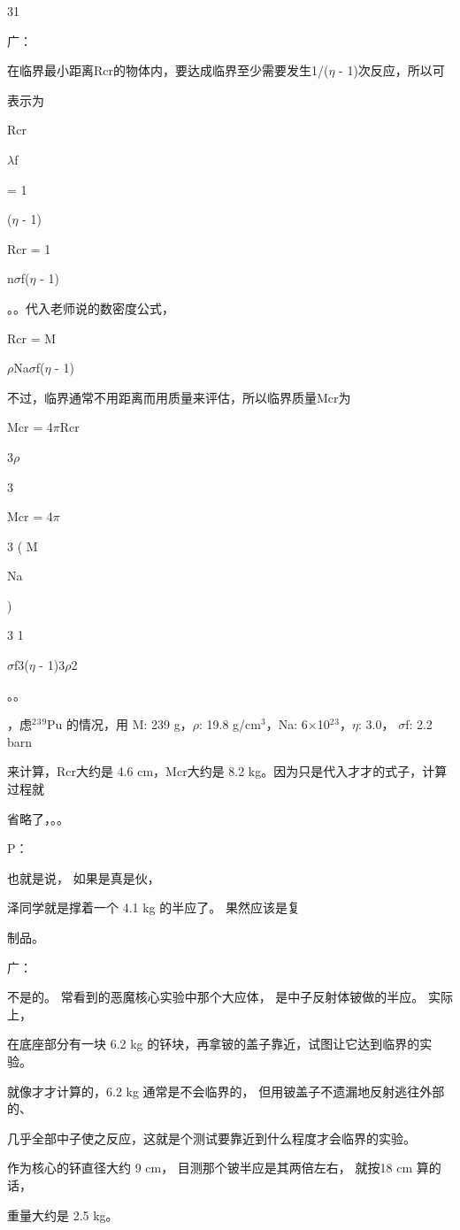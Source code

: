 31\par
广：\par
在临界最小距离Rcr的物体内，要达成临界至少需要发生1/($\eta$ - 1)次反应，所以可\par
表示为\par
Rcr\par
$\lambda$f\par
= 1\par
($\eta$ - 1)\par
Rcr = 1\par
n$\sigma$f($\eta$ - 1)\par
。。代入老师说的数密度公式，\par
Rcr = M\par
$\rho$Na$\sigma$f($\eta$ - 1)\par
不过，临界通常不用距离而用质量来评估，所以临界质量Mcr为\par
Mcr = 4$\pi$Rcr\par
3$\rho$\par
3\par
Mcr = 4$\pi$\par
3 ( M\par
Na\par
)\par
3 1\par
$\sigma$f3($\eta$ - 1)3$\rho$2\par
。。\par
，虑$^{2}$$^{3}$$^{9}$Pu 的情况，用 M: 239 g，$\rho$: 19.8 g/cm$^{3}$，Na: 6$\times$10$^{2}$$^{3}$，$\eta$: 3.0， $\sigma$f: 2.2 barn\par
来计算，Rcr大约是 4.6 cm，Mcr大约是 8.2 kg。因为只是代入才才的式子，计算过程就\par
省略了，。。\par
P：\par
也就是说， 如果是真是伙，\par
泽同学就是撑着一个 4.1 kg 的半应了。 果然应该是复\par
制品。\par
广：\par
不是的。 常看到的恶魔核心实验中那个大应体， 是中子反射体铍做的半应。 实际上，\par
在底座部分有一块 6.2 kg 的钚块，再拿铍的盖子靠近，试图让它达到临界的实验。\par
就像才才计算的，6.2 kg 通常是不会临界的， 但用铍盖子不遗漏地反射逃往外部的、\par
几乎全部中子使之反应，这就是个测试要靠近到什么程度才会临界的实验。\par
作为核心的钚直径大约 9 cm， 目测那个铍半应是其两倍左右， 就按18 cm 算的话，\par
重量大约是 2.5 kg。\par

